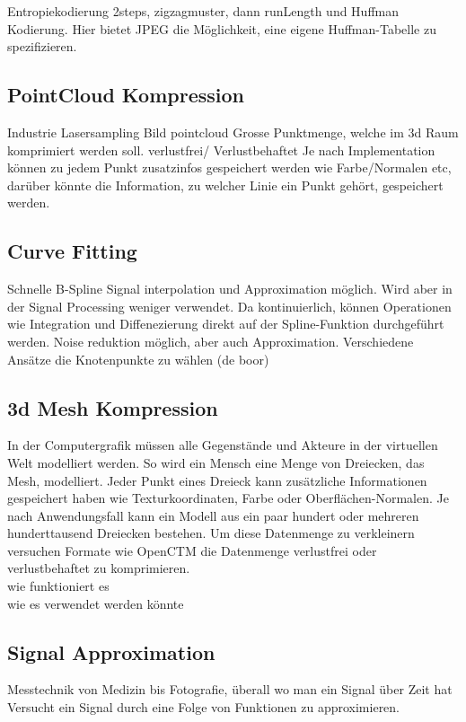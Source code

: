 Entropiekodierung 2steps, zigzagmuster, dann runLength und Huffman Kodierung. Hier bietet JPEG die Möglichkeit, eine eigene Huffman-Tabelle zu spezifizieren.

\subsection{PointCloud Kompression}
Industrie Lasersampling
Bild pointcloud \cite{merry2006compression:pointcloud}
Grosse Punktmenge, welche im 3d Raum komprimiert werden soll.
verlustfrei/ Verlustbehaftet
Je nach Implementation können zu jedem Punkt zusatzinfos gespeichert werden wie Farbe/Normalen etc, darüber könnte die Information, zu welcher Linie ein Punkt gehört, gespeichert werden.

\subsection{Curve Fitting}
\cite{unser1993b:spline} Schnelle B-Spline Signal interpolation und Approximation möglich. Wird aber in der Signal Processing weniger verwendet. Da kontinuierlich, können Operationen wie Integration und Diffenezierung direkt auf der Spline-Funktion durchgeführt werden. Noise reduktion möglich, aber auch Approximation. Verschiedene Ansätze die Knotenpunkte zu wählen (de boor)

\subsection{3d Mesh Kompression}
In der Computergrafik müssen alle Gegenstände und Akteure in der virtuellen Welt modelliert werden. So wird ein Mensch eine Menge von Dreiecken, das Mesh, modelliert. Jeder Punkt eines Dreieck kann zusätzliche Informationen gespeichert haben wie Texturkoordinaten, Farbe oder Oberflächen-Normalen. Je nach Anwendungsfall kann ein Modell aus ein paar hundert oder mehreren hunderttausend Dreiecken bestehen. Um diese Datenmenge zu verkleinern versuchen Formate wie OpenCTM \cite{website:openctm} die Datenmenge verlustfrei oder verlustbehaftet zu komprimieren.\\
wie funktioniert es\\

wie es verwendet werden könnte



\subsection{Signal Approximation}
Messtechnik von Medizin bis Fotografie, überall wo man ein Signal über Zeit hat
Versucht ein Signal durch eine Folge von Funktionen zu approximieren.

